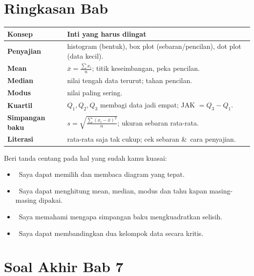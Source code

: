 \documentclass[11pt,a4paper]{report}
\theoremstyle{gaya}
\newcommand{\cek}{\ding{113}\ } %
\begin{document}
\section*{Ringkasan Bab}
\begin{center}
\begin{tabular}{>{\bfseries}p{3.5cm} p{10.2cm}}
\toprule
Konsep & Inti yang harus diingat \\
\midrule
Penyajian & histogram (bentuk), box plot (sebaran/pencilan), dot plot (data kecil). \\
Mean & $\bar x=\tfrac{\sum x_i}{n}$; titik keseimbangan, peka pencilan. \\
Median & nilai tengah data terurut; tahan pencilan. \\
Modus & nilai paling sering. \\
Kuartil & $Q_1,Q_2,Q_3$ membagi data jadi empat; JAK $=Q_3-Q_1$. \\
Simpangan baku & $s=\sqrt{\tfrac{\sum(x_i-\bar x)^2}{n}}$; ukuran sebaran rata-rata. \\
Literasi & rata-rata saja tak cukup; cek sebaran \&\ cara penyajian. \\
\bottomrule
\end{tabular}
\end{center}

\begin{refleksi}
Beri tanda centang pada hal yang sudah kamu kuasai:
\begin{itemize}[leftmargin=*,label={},topsep=2pt]
  \item \cek Saya dapat memilih dan membaca diagram yang tepat.
  \item \cek Saya dapat menghitung mean, median, modus dan tahu kapan masing-masing dipakai.
  \item \cek Saya memahami mengapa simpangan baku mengkuadratkan selisih.
  \item \cek Saya dapat membandingkan dua kelompok data secara kritis.
\end{itemize}
\end{refleksi}

\section*{Soal Akhir Bab 7}
\end{document}
